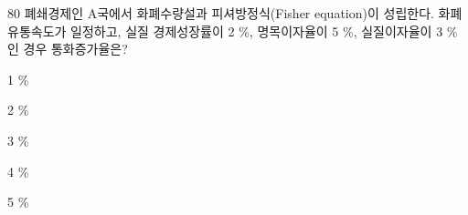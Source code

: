 \begin{question}{80}
폐쇄경제인 A국에서 화폐수량설과 피셔방정식(Fisher equation)이 성립한다. 화폐유통속도가 일정하고, 실질 경제성장률이 2 \%, 명목이자율이 5 \%, 실질이자율이 3 \%인 경우 통화증가율은?
\begin{choices}
  \item 1 \%
  \item 2 \%
  \item 3 \%
  \item 4 \%
  \item 5 \%
\end{choices}
\end{question}
